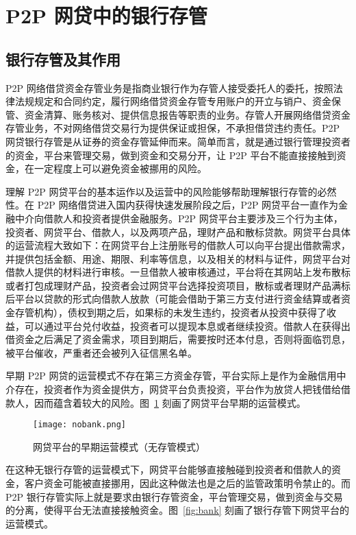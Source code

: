 \documentclass[lang=cn,11pt,authoryear]{elegantpaper}
\begin{document}
\section{P2P 网贷中的银行存管}

\subsection{银行存管及其作用}

P2P 网络借贷资金存管业务是指商业银行作为存管人接受委托人的委托，按照法律法规规定和合同约定，履行网络借贷资金存管专用账户的开立与销户、资金保管、资金清算、账务核对、提供信息报告等职责的业务。存管人开展网络借贷资金存管业务，不对网络借贷交易行为提供保证或担保，不承担借贷违约责任。P2P 网贷银行存管是从证券的资金存管延伸而来。简单而言，就是通过银行管理投资者的资金，平台来管理交易，做到资金和交易分开，让 P2P 平台不能直接接触到资金，在一定程度上可以避免资金被挪用的风险。
 


理解 P2P 网贷平台的基本运作以及运营中的风险能够帮助理解银行存管的必然性。在 P2P 网络借贷进入国内获得快速发展阶段之后，P2P 网贷平台一直作为金融中介向借款人和投资者提供金融服务。P2P 网贷平台主要涉及三个行为主体，投资者、网贷平台、借款人，以及两项产品，理财产品和散标贷款。网贷平台具体的运营流程大致如下：在网贷平台上注册账号的借款人可以向平台提出借款需求，并提供包括金额、用途、期限、利率等信息，以及相关的材料与证件，网贷平台对借款人提供的材料进行审核。一旦借款人被审核通过，平台将在其网站上发布散标或者打包成理财产品，投资者会过网贷平台选择投资项目，散标或者理财产品满标后平台以贷款的形式向借款人放款（可能会借助于第三方支付进行资金结算或者资金存管机构），债权到期之后，如果标的未发生违约，投资者从投资中获得了收益，可以通过平台兑付收益，投资者可以提现本息或者继续投资。借款人在获得出借资金之后满足了资金需求，项目到期后，需要按时还本付息，否则将面临罚息，被平台催收，严重者还会被列入征信黑名单。


早期 P2P 网贷的运营模式不存在第三方资金存管，平台实际上是作为金融信用中介存在，投资者作为资金提供方，网贷平台负责投资，平台作为放贷人把钱借给借款人，因而蕴含着较大的风险。图~\ref{fig:nobank} 刻画了网贷平台早期的运营模式。

 \begin{figure}[hbtp]
\centering
\texttt{[image: nobank.png]}
\caption{ 网贷平台的早期运营模式（无存管模式）\label{fig:nobank}}
\end{figure}

在这种无银行存管的运营模式下，网贷平台能够直接触碰到投资者和借款人的资金，客户资金可能被直接挪用，因此这种做法也是之后的监管政策明令禁止的。而 P2P 银行存管实际上就是要求由银行存管资金，平台管理交易，做到资金与交易的分离，使得平台无法直接接触资金。图~\ref{fig:bank} 刻画了银行存管下网贷平台的运营模式。
\end{document}
